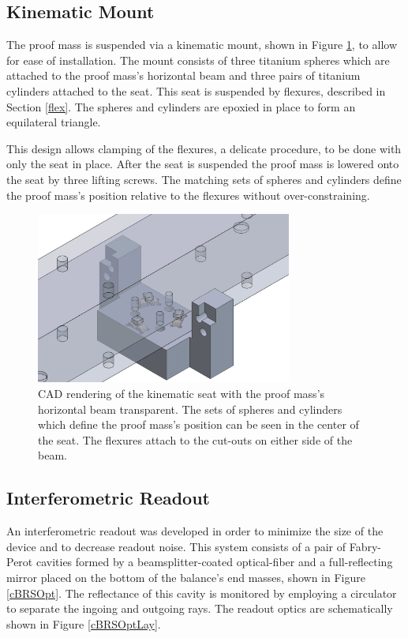 \documentclass [12pt, proquest]{uwthesis}[2019]
\begin{document}
\subsection{Kinematic Mount}

The proof mass is suspended via a kinematic mount, shown in Figure \ref{kmount}, to allow for ease of installation. The mount consists of three titanium spheres which are attached to the proof mass's horizontal beam and three pairs of titanium cylinders attached to the seat. This seat is suspended by flexures, described in Section \ref{flex}. The spheres and cylinders are epoxied in place to form an equilateral triangle.

This design allows clamping of the flexures, a delicate procedure, to be done with only the seat in place. After the seat is suspended the proof mass is lowered onto the seat by three lifting screws. The matching sets of spheres and cylinders define the proof mass's position relative to the flexures without over-constraining.

\begin{figure}[!h]
\begin{center}
\includegraphics[width=0.75\textwidth]{cBRSKMount.png}
\end{center}
\caption[CAD rendering of the cBRS kinematic mount]{CAD rendering of the kinematic seat with the proof mass's horizontal beam transparent. The sets of spheres and cylinders which define the proof mass's position can be seen in the center of the seat. The flexures attach to the cut-outs on either side of the beam.}\label{kmount}
\end{figure}

\subsection{Interferometric Readout}
An interferometric readout was developed in order to minimize the size of the device and to decrease readout noise. This system consists of a pair of Fabry-Perot cavities formed by a beamsplitter-coated optical-fiber and a full-reflecting mirror placed on the bottom of the balance's end masses, shown in Figure \ref{cBRSOpt}. The reflectance of this cavity is monitored by employing a circulator to separate the ingoing and outgoing rays. The readout optics are schematically shown in Figure \ref{cBRSOptLay}. 
\end{document}
